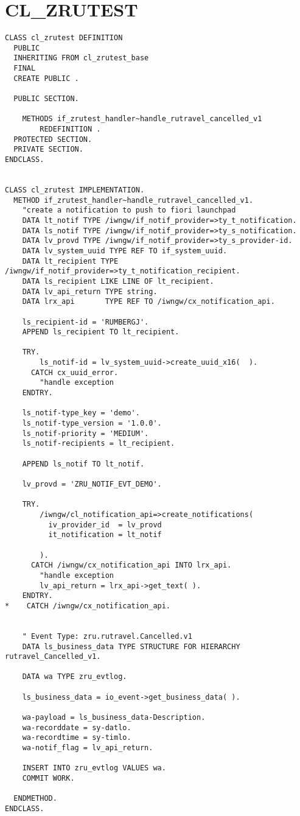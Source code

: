 \section*{ CL\_ZRUTEST } 

\begin{Verbatim}[breaklines=true]
CLASS cl_zrutest DEFINITION
  PUBLIC
  INHERITING FROM cl_zrutest_base
  FINAL
  CREATE PUBLIC .

  PUBLIC SECTION.

    METHODS if_zrutest_handler~handle_rutravel_cancelled_v1
        REDEFINITION .
  PROTECTED SECTION.
  PRIVATE SECTION.
ENDCLASS.


CLASS cl_zrutest IMPLEMENTATION.
  METHOD if_zrutest_handler~handle_rutravel_cancelled_v1.
    "create a notification to push to fiori launchpad
    DATA lt_notif TYPE /iwngw/if_notif_provider=>ty_t_notification.
    DATA ls_notif TYPE /iwngw/if_notif_provider=>ty_s_notification.
    DATA lv_provd TYPE /iwngw/if_notif_provider=>ty_s_provider-id.
    DATA lv_system_uuid TYPE REF TO if_system_uuid.
    DATA lt_recipient TYPE /iwngw/if_notif_provider=>ty_t_notification_recipient.
    DATA ls_recipient LIKE LINE OF lt_recipient.
    DATA lv_api_return TYPE string.
    DATA lrx_api       TYPE REF TO /iwngw/cx_notification_api.

    ls_recipient-id = 'RUMBERGJ'.
    APPEND ls_recipient TO lt_recipient.

    TRY.
        ls_notif-id = lv_system_uuid->create_uuid_x16(  ).
      CATCH cx_uuid_error.
        "handle exception
    ENDTRY.

    ls_notif-type_key = 'demo'.
    ls_notif-type_version = '1.0.0'.
    ls_notif-priority = 'MEDIUM'.
    ls_notif-recipients = lt_recipient.

    APPEND ls_notif TO lt_notif.

    lv_provd = 'ZRU_NOTIF_EVT_DEMO'.

    TRY.
        /iwngw/cl_notification_api=>create_notifications(
          iv_provider_id  = lv_provd
          it_notification = lt_notif

        ).
      CATCH /iwngw/cx_notification_api INTO lrx_api.
        "handle exception
        lv_api_return = lrx_api->get_text( ).
    ENDTRY.
*    CATCH /iwngw/cx_notification_api.


    " Event Type: zru.rutravel.Cancelled.v1
    DATA ls_business_data TYPE STRUCTURE FOR HIERARCHY rutravel_Cancelled_v1.

    DATA wa TYPE zru_evtlog.

    ls_business_data = io_event->get_business_data( ).

    wa-payload = ls_business_data-Description.
    wa-recorddate = sy-datlo.
    wa-recordtime = sy-timlo.
    wa-notif_flag = lv_api_return.

    INSERT INTO zru_evtlog VALUES wa.
    COMMIT WORK.

  ENDMETHOD.
ENDCLASS.
\end{Verbatim}

